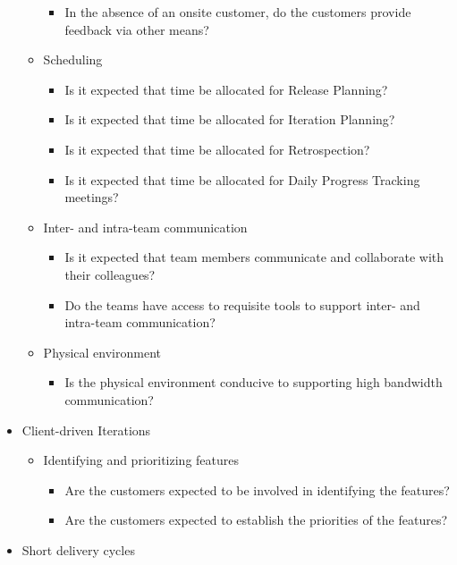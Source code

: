 \begin{appendices}
\begin{itemize}
\begin{itemize}
\begin{itemize}
					\item In the absence of an onsite customer, do the customers provide feedback via other means? 
				\end{itemize}	
			\item Scheduling
				\begin{itemize}
					\item Is it expected that time be allocated for Release Planning?
					\item Is it expected that time be allocated for Iteration Planning?
					\item Is it expected that time be allocated for Retrospection? 
					\item Is it expected that time be allocated for Daily Progress Tracking meetings?
				\end{itemize}
			\item Inter- and intra-team communication
				\begin{itemize}
					\item Is it expected that team members communicate and collaborate with their colleagues?
					\item Do the teams have access to requisite tools to support inter- and intra-team communication?
				\end{itemize}
			\item Physical environment
				\begin{itemize}
					\item Is the physical environment conducive to supporting high bandwidth communication?
				\end{itemize}
		\end{itemize}
	\item Client-driven Iterations
		\begin{itemize}
			\item Identifying and prioritizing features
				\begin{itemize}
					\item Are the customers expected to be involved in identifying the features?
					\item Are the customers expected to establish the priorities of the features?
				\end{itemize}
		\end{itemize}
	\item Short delivery cycles
		\begin{itemize}

\end{itemize}
\end{itemize}
\end{appendices}
